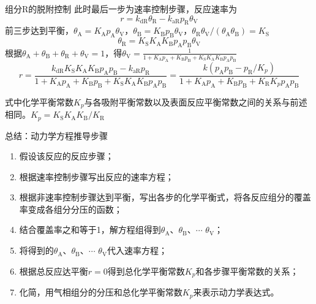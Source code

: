 \begin{frame}{组分R的脱附控制}
    此时最后一步为速率控制步骤，反应速率为
    \[
        r=k_\mathrm{dR}\theta_\mathrm{R}-k_\mathrm{aR}p_\mathrm{R}\theta_\mathrm{V}
    \]
    前三步达到平衡，$\theta_{\mathrm{A}}=K_\mathrm{A}p_\mathrm{A}\theta_\mathrm{V}$，$\theta_\mathrm{B}= K_\mathrm{B}p_\mathrm{B}\theta_\mathrm{V}$，$\theta_{\mathrm{R}} \theta_{\mathrm{V}} /(\theta_{\mathrm{A}} \theta_{\mathrm{B}})=K_{\mathrm{S}}$
    \[
        \theta_\mathrm{R}={K}_\mathrm{S}K_\mathrm{A}K_{\mathrm{B}}p_\mathrm{A}p_\mathrm{B}\theta_\mathrm{V}
    \]
    根据$\theta_\mathrm{A}+\theta_\mathrm{B}+\theta_\mathrm{R}+\theta_\mathrm{V}=1$，得$\theta_\mathrm{V}=\frac{1}{1+K_\mathrm{A}p_\mathrm{A}+K_\mathrm{B}p_\mathrm{B}+K_\mathrm{S}K_\mathrm{A}K_\mathrm{B}p_\mathrm{A}p_\mathrm{B}}$
    \[
        r=\frac{k_{\mathrm{dR}} K_{\mathrm{S}} K_{\mathrm{A}} K_{\mathrm{B}} p_{\mathrm{A}} p_{\mathrm{B}}-k_{\mathrm{aR}} p_{\mathrm{R}}}{1+K_{\mathrm{A}} p_{\mathrm{A}}+K_{\mathrm{B}} p_{\mathrm{B}}+K_{\mathrm{S}} K_{\mathrm{A}} K_{\mathrm{B}} p_{\mathrm{A}} p_{\mathrm{B}}}=\frac{k(p_{\mathrm{A}} p_{\mathrm{B}}-p_{\mathrm{R}} / K_{p})}{1+K_{\mathrm{A}} p_{\mathrm{A}}+K_{\mathrm{B}} p_{\mathrm{B}}+K_{\mathrm{R}} K_{p} p_{\mathrm{A}} p_{\mathrm{B}}}
    \]
    \begin{alertblock}
        式中化学平衡常数$K_p$与各吸附平衡常数以及表面反应平衡常数之间的关系与前述相同。$K_p = {K}_{\mathrm{S}} K_{\mathrm{A}} K_{\mathrm{B}}/K_\mathrm{R}$
    \end{alertblock}
\end{frame}


\begin{frame}{总结：动力学方程推导步骤}
    \begin{enumerate}
        \item 假设该反应的反应步骤；
        \item 根据速率控制步骤写出反应的速率方程；
        \item 根据非速率控制步骤达到平衡，写出各步的化学平衡式，将各反应组分的覆盖率变成各组分分压的函数；
        \item 结合覆盖率之和等于1，解方程组得到$\theta_\mathrm{A}$、$\theta_\mathrm{B}$、$\cdots$ $\theta_\mathrm{V}$；
        \item 将得到的$\theta_\mathrm{A}$、$\theta_\mathrm{B}$、$\cdots$ $\theta_\mathrm{V}$代入速率方程；
        \item 根据总反应达平衡$r = 0$得到总化学平衡常数$K_p$和各步骤平衡常数的关系；
        \item 化简，用气相组分的分压和总化学平衡常数$K_p$来表示动力学表达式。
    \end{enumerate}
\end{frame}


